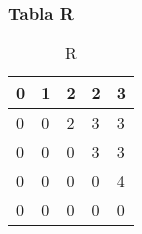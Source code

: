 \documentclass[10]{beamer}
\begin{document}
\begin{frame}\frametitle{Tabla R}
 \color{white}
\begin{table}[H]
\centering
\caption{R}
\label{R}
\begin{tabular}{|l|l|l|l|l|}
\hline
0& 1& 2& 2& 3\\ \hline
0& 0& 2& 3& 3\\ \hline
0& 0& 0& 3& 3\\ \hline
0& 0& 0& 0& 4\\ \hline
0& 0& 0& 0& 0\\ \hline
\end{tabular}
\end{table} 
\end{frame} 
\end{document}
